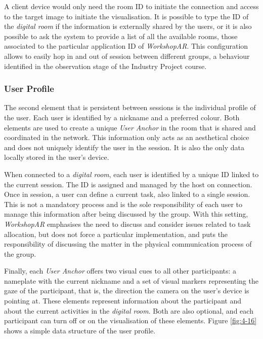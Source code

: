 A client device would only need the room ID to initiate the connection and access to the target image to initiate the visualisation. It is possible to type the ID of the \emph{digital room}
if the information is externally shared by the users, or it is also possible to ask the system to provide a list of all the available rooms, those associated to the particular application
ID of \emph{WorkshopAR}. This configuration allows to easily hop in and out of session between different groups, a behaviour identified in the observation stage of the Industry Project
course.

\subsubsection{User Profile \label{sec:4-3-4-2}}

The second element that is persistent between sessions is the individual profile of the user. Each user is identified by a nickname and a preferred colour. Both elements are used to create
a unique \emph{User Anchor} in the room that is shared and coordinated in the network. This information only acts as an aesthetical choice and does not uniquely identify the user in the
session. It is also the only data locally stored in the user's device.

When connected to a \emph{digital room}, each user is identified by a unique ID linked to the current session. The ID is assigned and managed by the host on connection. Once in session, a
user can define a current task, also linked to a single session. This is not a mandatory process and is the sole responsibility of each user to manage this information after being
discussed by the group. With this setting, \emph{WorkshopAR} emphasises the need to discuss and consider issues related to task allocation, but does not force a particular implementation,
and puts the responsibility of discussing the matter in the physical communication process of the group.

Finally, each \emph{User Anchor} offers two visual cues to all other participants: a nameplate with the current nickname and a set of visual markers representing the gaze of the
participant, that is, the direction the camera on the user's device is pointing at. These elements represent information about the participant and about the current activities in the \emph{digital room}.
Both are also optional, and each participant can turn off or on the visualisation of these elements. Figure \ref{fig:4-16} shows a simple data structure of the user profile.

